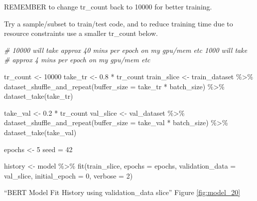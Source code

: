 \documentclass[
]{article}
\newenvironment{Shaded}{}{}
\newcommand{\AttributeTok}[1]{\textcolor[rgb]{0.49,0.56,0.16}{#1}}
\newcommand{\CommentTok}[1]{\textcolor[rgb]{0.38,0.63,0.69}{\textit{#1}}}
\newcommand{\DecValTok}[1]{\textcolor[rgb]{0.25,0.63,0.44}{#1}}
\newcommand{\FloatTok}[1]{\textcolor[rgb]{0.25,0.63,0.44}{#1}}
\newcommand{\FunctionTok}[1]{\textcolor[rgb]{0.02,0.16,0.49}{#1}}
\newcommand{\NormalTok}[1]{#1}
\newcommand{\OtherTok}[1]{\textcolor[rgb]{0.00,0.44,0.13}{#1}}
\newcommand{\SpecialCharTok}[1]{\textcolor[rgb]{0.25,0.44,0.63}{#1}}
\begin{document}
REMEMBER to change tr\_count back to 10000 for better training.

Try a sample/subset to train/test code, and to reduce training time due
to resource constraints use a smaller tr\_count below.

\begin{Shaded}
\begin{Highlighting}[]
\CommentTok{\# 10000 will take approx 40 mins per epoch on my gpu/mem etc 1000 will take}
\CommentTok{\# approx 4 mins per epoch on my gpu/mem etc}

\NormalTok{tr\_count }\OtherTok{\textless{}{-}} \DecValTok{10000}
\NormalTok{take\_tr }\OtherTok{\textless{}{-}} \FloatTok{0.8} \SpecialCharTok{*}\NormalTok{ tr\_count}
\NormalTok{train\_slice }\OtherTok{\textless{}{-}}\NormalTok{ train\_dataset }\SpecialCharTok{\%\textgreater{}\%}
    \FunctionTok{dataset\_shuffle\_and\_repeat}\NormalTok{(}\AttributeTok{buffer\_size =}\NormalTok{ take\_tr }\SpecialCharTok{*}\NormalTok{ batch\_size) }\SpecialCharTok{\%\textgreater{}\%}
    \FunctionTok{dataset\_take}\NormalTok{(take\_tr)}

\NormalTok{take\_val }\OtherTok{\textless{}{-}} \FloatTok{0.2} \SpecialCharTok{*}\NormalTok{ tr\_count}
\NormalTok{val\_slice }\OtherTok{\textless{}{-}}\NormalTok{ val\_dataset }\SpecialCharTok{\%\textgreater{}\%}
    \FunctionTok{dataset\_shuffle\_and\_repeat}\NormalTok{(}\AttributeTok{buffer\_size =}\NormalTok{ take\_val }\SpecialCharTok{*}\NormalTok{ batch\_size) }\SpecialCharTok{\%\textgreater{}\%}
    \FunctionTok{dataset\_take}\NormalTok{(take\_val)}
\end{Highlighting}
\end{Shaded}

\begin{Shaded}
\begin{Highlighting}[]
\NormalTok{epochs }\OtherTok{\textless{}{-}} \DecValTok{5}
\NormalTok{seed }\OtherTok{=} \DecValTok{42}

\NormalTok{history }\OtherTok{\textless{}{-}}\NormalTok{ model }\SpecialCharTok{\%\textgreater{}\%}
    \FunctionTok{fit}\NormalTok{(train\_slice, }\AttributeTok{epochs =}\NormalTok{ epochs, }\AttributeTok{validation\_data =}\NormalTok{ val\_slice, }\AttributeTok{initial\_epoch =} \DecValTok{0}\NormalTok{,}
        \AttributeTok{verbose =} \DecValTok{2}\NormalTok{)}
\end{Highlighting}
\end{Shaded}

``BERT Model Fit History using validation\_data slice'' Figure
\ref{fig:model_20}
\end{document}
